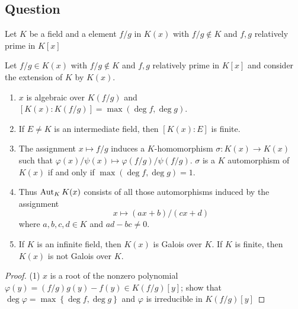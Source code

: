 \subsection{}









\subsection{Question}
\begin{lemma}
    Let $K$ be a field and a element $f/g$ in $K\left(x\right)$ with $f / g \notin K$ and $f, g$ relatively prime in $K[x]$
\end{lemma}
\begin{proposition}
    Let $f / g \in K(x)$ with $f / g \notin K$ and $f, g$ relatively prime in $K[x]$ and consider the extension of $K$ by $K(x)$.
    \begin{enumerate}
        \item
              $x$ is algebraic over $K(f / g)$ and $[K(x): K(f / g)]=\max (\deg f, \deg g)$.
        \item

              If $E \neq K$ is an intermediate field, then $[K(x): E]$ is finite.
        \item

              The assignment $x \mapsto f / g$ induces a $K$-homomorphism $\sigma: K(x) \rightarrow K(x)$ such that $\varphi(x) / \psi(x) \mapsto \varphi(f / g) / \psi(f / g)$. $\sigma$ is a $K$ automorphism of $K(x)$ if and only if $\max (\deg f, \deg g)=1$.
        \item

              Thus $\operatorname{\operatorname{Aut}}_K K(x)$ consists of all those automorphisms induced by the assignment
              \begin{equation*}
                  x \mapsto(a x+b) /(c x+d)
              \end{equation*}
              where $a, b, c, d \in K$ and $a d-b c \neq 0$.
        \item

              If $K$ is an infinite field, then $K(x)$ is Galois over $K$.
              If $K$ is finite, then $K(x)$ is not Galois over $K$.
    \end{enumerate}
    \begin{proof}
        (1) $x$ is a root of the nonzero polynomial $\varphi(y)=(f / g) g(y)-f(y) \in K(f / g)[y]$; show that $\deg \varphi=\max \left\{\deg f, \deg g\right\}$ and $\varphi$ is irreducible in $K(f / g)[y]$


\end{proof}
\end{proposition}
